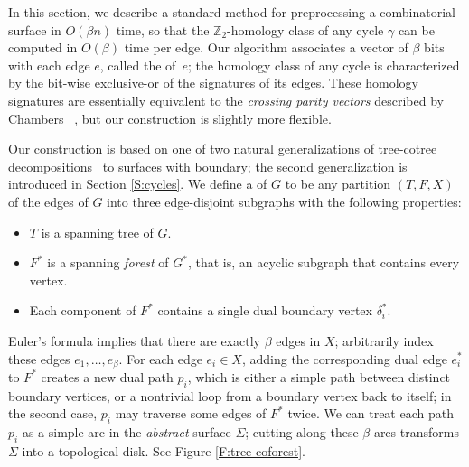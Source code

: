 \documentclass[twoside,leqno,twocolumn]{article}
\def\Z{\mathbb{Z}}
\let\cycle\gamma
\def\dualarc{p}
\begin{document}
In this section, we describe a standard method for preprocessing a combinatorial surface in $O(\beta n)$ time, so that the $\Z_2$-homology class of any cycle $\cycle$ can be computed in $O(\beta)$ time per edge.  Our algorithm associates a vector of $\beta$ bits with each edge $e$, called the  of~$e$; the homology class of any cycle is characterized by the bit-wise exclusive-or of the signatures of its edges.  These homology signatures are essentially equivalent to the \emph{crossing parity vectors} described by Chambers \etal~\cite{surfcut}, but our construction is slightly more flexible.

Our construction is based on one of two natural generalizations of tree-cotree decompositions~\cite{e-dgteg-03} to surfaces with boundary; the second generalization is introduced in Section \ref{S:cycles}.  We define a  of $G$ to be any partition $(T, F, X)$ of the edges of $G$ into three edge-disjoint subgraphs with the following properties:
\begin{itemize}\itemsep0pt
\item $T$ is a spanning tree of $G$.
\item $F^*$ is a spanning \emph{forest} of $G^*$, that is, an acyclic subgraph that contains every vertex.
\item Each component of $F^*$ contains a single dual boundary vertex $\delta_i^*$.
\end{itemize}
Euler's formula implies that there are exactly $\beta$ edges in $X$; arbitrarily index these edges $e_1, \dots, e_\beta$.  For each edge $e_i\in X$, adding the corresponding dual edge $e_i^*$ to $F^*$ creates a new dual path $\dualarc_i$, which is either a simple path between distinct boundary vertices, or a nontrivial loop from a boundary vertex back to itself; in the second case, $\dualarc_i$ may traverse some edges of $F^*$ twice.  We can treat each path $\dualarc_i$ as a simple arc in the \emph{abstract} surface $\Sigma$; cutting along these $\beta$ arcs transforms $\Sigma$ into a topological disk.  See Figure \ref{F:tree-coforest}.
\end{document}
